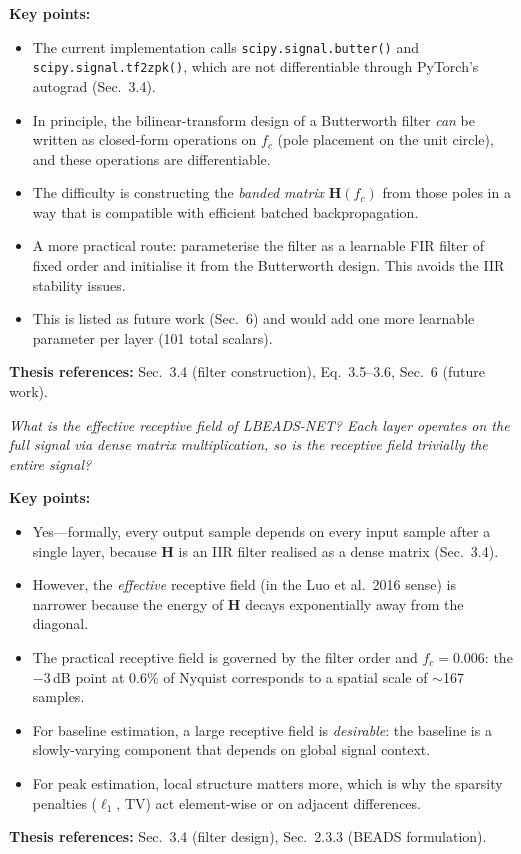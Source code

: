 \documentclass[11pt, letterpaper]{article}
\newcounter{qcounter}
\newcommand{\question}[1]{%
  \stepcounter{qcounter}%
  \begin{questionbox}[Q\theqcounter]%
    \itshape #1%
  \end{questionbox}%
}
\begin{document}
\begin{answerbox}
\textbf{Key points:}
\begin{itemize}[nosep]
  \item The current implementation calls
        \texttt{scipy.signal.butter()} and
        \texttt{scipy.signal.tf2zpk()}, which are not differentiable
        through PyTorch's autograd (Sec.~3.4).
  \item In principle, the bilinear-transform design of a Butterworth
        filter \emph{can} be written as closed-form operations on
        $f_c$ (pole placement on the unit circle), and these operations
        are differentiable.
  \item The difficulty is constructing the \emph{banded matrix}
        $\mathbf{H}(f_c)$ from those poles in a way that is compatible
        with efficient batched backpropagation.
  \item A more practical route: parameterise the filter as a
        learnable FIR filter of fixed order and initialise it from the
        Butterworth design.  This avoids the IIR stability issues.
  \item This is listed as future work (Sec.~6) and would add one more
        learnable parameter per layer (101 total scalars).
\end{itemize}
\textbf{Thesis references:} Sec.~3.4 (filter construction), Eq.~3.5--3.6, Sec.~6 (future work).
\end{answerbox}

\question{What is the effective receptive field of LBEADS-NET?  Each layer
operates on the full signal via dense matrix multiplication, so is
the receptive field trivially the entire signal?}

\begin{answerbox}
\textbf{Key points:}
\begin{itemize}[nosep]
  \item Yes---formally, every output sample depends on every input
        sample after a single layer, because $\mathbf{H}$ is an IIR
        filter realised as a dense matrix (Sec.~3.4).
  \item However, the \emph{effective} receptive field (in the
        Luo et al.\ 2016 sense) is narrower because the energy of
        $\mathbf{H}$ decays exponentially away from the diagonal.
  \item The practical receptive field is governed by the filter order
        and $f_c{=}0.006$: the $-3$\,dB point at $0.6\%$ of Nyquist
        corresponds to a spatial scale of $\sim$167 samples.
  \item For baseline estimation, a large receptive field is
        \emph{desirable}: the baseline is a slowly-varying component
        that depends on global signal context.
  \item For peak estimation, local structure matters more, which is
        why the sparsity penalties ($\ell_1$, TV) act element-wise
        or on adjacent differences.
\end{itemize}
\textbf{Thesis references:} Sec.~3.4 (filter design), Sec.~2.3.3 (BEADS formulation).
\end{answerbox}
\end{document}
